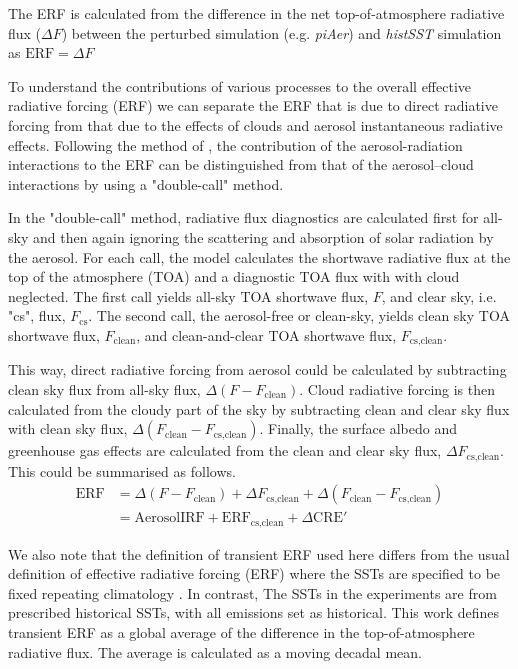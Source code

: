 The ERF is calculated from the difference in the net top-of-atmosphere radiative flux ($\Delta F$) between the perturbed simulation (e.g. \textit{piAer}) and \textit{histSST} simulation as  $\text{ERF} = \Delta F$

To understand the contributions of various processes to the overall effective radiative forcing (ERF) we can separate the ERF that is due to direct radiative forcing from that due to the effects of clouds and aerosol instantaneous radiative effects. Following the method of \citet{ghanTechnicalNoteEstimating2013}, the contribution of the aerosol-radiation interactions to the ERF can be distinguished from that of the aerosol–cloud interactions by using a "double-call" method.

In the "double-call" method, radiative flux diagnostics are calculated first for all-sky and then again ignoring the scattering and absorption of solar radiation by the aerosol. For each call, the model calculates the shortwave radiative flux at the top of the atmosphere (TOA) and a diagnostic TOA flux with with cloud neglected. The first call yields all-sky TOA shortwave flux, $F$, and clear sky, i.e. "cs", flux, $F_{\text{cs}}$. The second call, the aerosol-free or clean-sky, yields clean sky TOA shortwave flux, $F_{\text{clean}}$, and clean-and-clear TOA shortwave flux, $F_{\text{cs,clean}}$.

This way, direct radiative forcing from aerosol could be calculated by subtracting clean sky flux from all-sky flux, $\Delta (F - F_{\text{clean}})$. Cloud radiative forcing is then calculated from the cloudy part of the sky by subtracting clean and clear sky flux with clean sky flux, $\Delta (F_{\text{clean}} - F_{\text{cs,clean}})$. Finally, the surface albedo and greenhouse gas effects are calculated from the clean and clear sky flux, $\Delta F_{\text{cs,clean}}$. This could be summarised as follows.
\begin{equation}[] 
\label{eq:erf}
\begin{split}
\text{ERF} &=  \Delta(F-F_{\text{clean}}) + \Delta F_{\text{cs,clean}} + \Delta ({F_{\text{clean}}-F_{\text{cs,clean}}}) \\
 & = \text{AerosolIRF} + \text{ERF}_{\text{cs,clean}}+\Delta \text{CRE}'
\end{split}
\end{equation}

We also note that the definition of transient ERF used here differs from the usual definition of effective radiative forcing (ERF) where the SSTs are specified to be fixed repeating climatology \citep{eyringOverviewCoupledModel2016}. In contrast, The SSTs in the experiments are from prescribed historical SSTs, with all emissions set as historical. This work defines transient ERF as a global average of the difference in the top-of-atmosphere radiative flux. The average is calculated as a moving decadal mean.   




